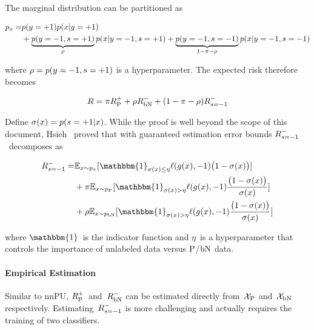 The marginal distribution can be partitioned as

\begin{equation*}
  \begin{aligned}
    p_{x} = &p(y = {+}1) p(x \vert y = {+}1) \\
                &+ \underbrace{p(y = {-}1, s = {+}1)}_{\rho}p(x \vert y = {-}1, s = {+}1)
                + \underbrace{p(y = {-}1, s = {-}1)}_{1 - \pi - \rho} p(x \vert y = {-}1, s = {-}1)
  \end{aligned}
\end{equation*}

\noindent
where ${\rho = p(y = {-}1, s = {+}1)}$ is a hyperparameter. The expected risk therefore becomes

\begin{equation}\label{eq:Risk:WithBN}
  R = \pi R_{\textnormal{P}}^{{+}} + \rho R_{\textnormal{bN}}^{{-}} + (1 - \pi - \rho) R_{s = {-}1}^{-}
\end{equation}

Define ${\sigma(x) = p(s = {+}1 \vert x)}$.  While the proof is well beyond the scope of this document, Hsieh\etal~\cite{Hsieh:2018} proved that with guaranteed estimation error bounds $R_{s = {-}1}^{-}$~decomposes as

\begin{equation}\label{eq:ExpectedRisk:PUbN:Latent}
  \begin{aligned}
    \smrisk = &\mathbb{E}_{\X \sim \marginal}\sbrack{\mathbbm{1}_{\sigX \leq \eta} \floss{\decX}{\ncls} \sigdiff} \\
              &+ \prior \mathbb{E}_{\X \sim \pcond} \sbrack{\mathbbm{1}_{\sigX > \eta} \floss{\decX}{\ncls} \frac{\sigdiff}{\sigX}} \\
              &+ \plabel \mathbb{E}_{\X \sim \bncond} \sbrack{\mathbbm{1}_{\sigX > \eta} \floss{\decX}{\ncls} \frac{\sigdiff}{\sigX}}
  \end{aligned}
\end{equation}

\noindent
where $\mathbbm{1}$~is the indicator function and $\eta$~is a hyperparameter that controls the importance of unlabeled data versus $\textnormal{P}$/$\textnormal{bN}$ data.

\paragraph{Empirical Estimation} Similar to nnPU, $R_{\textnormal{P}}^{{+}}$~and~$R_{\textnormal{bN}}^{{-}}$ can be estimated directly from~$\mathcal{X}_{\textnormal{P}}$ and~$\mathcal{X}_{\textnormal{bN}}$ respectively.  Estimating~$R_{s = {-}1}^{-}$ is more challenging and actually requires the training of two classifiers.

